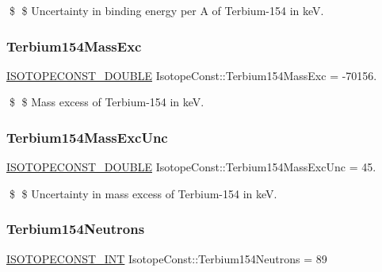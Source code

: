 \$ \$ Uncertainty in binding energy per A of Terbium-\/154 in keV. \mbox{\label{group___isotope_const-_terbium-_tb154_ga706a7f1e35d063d5cc6e420d3826aff6}} 
\subsubsection{\texorpdfstring{Terbium154\+Mass\+Exc}{Terbium154MassExc}}
{\footnotesize\ttfamily \mbox{\hyperlink{group___isotope_const-_macros_ga8f45a7272ce02c0b4c65c44636ed719a}{I\+S\+O\+T\+O\+P\+E\+C\+O\+N\+S\+T\+\_\+\+D\+O\+U\+B\+LE}} Isotope\+Const\+::\+Terbium154\+Mass\+Exc = -\/70156.}

\$ \$ Mass excess of Terbium-\/154 in keV. \mbox{\label{group___isotope_const-_terbium-_tb154_ga307cfd8f6385237388a068fda88d26ca}} 
\subsubsection{\texorpdfstring{Terbium154\+Mass\+Exc\+Unc}{Terbium154MassExcUnc}}
{\footnotesize\ttfamily \mbox{\hyperlink{group___isotope_const-_macros_ga8f45a7272ce02c0b4c65c44636ed719a}{I\+S\+O\+T\+O\+P\+E\+C\+O\+N\+S\+T\+\_\+\+D\+O\+U\+B\+LE}} Isotope\+Const\+::\+Terbium154\+Mass\+Exc\+Unc = 45.}

\$ \$ Uncertainty in mass excess of Terbium-\/154 in keV. \mbox{\label{group___isotope_const-_terbium-_tb154_ga95e8080ce1c1d694ec6ab7bec28da287}} 
\subsubsection{\texorpdfstring{Terbium154\+Neutrons}{Terbium154Neutrons}}
{\footnotesize\ttfamily \mbox{\hyperlink{group___isotope_const-_macros_ga5f18360b3e99483a35c32d789e62621c}{I\+S\+O\+T\+O\+P\+E\+C\+O\+N\+S\+T\+\_\+\+I\+NT}} Isotope\+Const\+::\+Terbium154\+Neutrons = 89}

